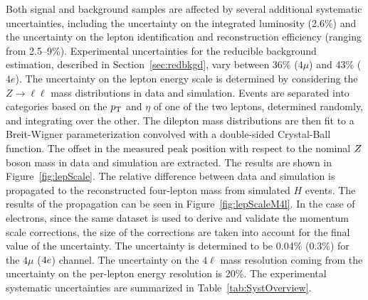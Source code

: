 Both signal and background samples are affected by several additional systematic uncertainties, including the uncertainty on the integrated luminosity
(2.6\%) and the uncertainty on the lepton identification and reconstruction efficiency (ranging from 2.5--9\%). Experimental uncertainties for the reducible background estimation, 
described in Section~\ref{sec:redbkgd},
vary between 36\% ($4\mu$)  and 43\% ($4e$).  The uncertainty on the lepton energy scale is determined by considering the 
$Z\rightarrow\ell\ell$ mass distributions in data and simulation. Events are separated into categories based on the 
$p_{\rm{T}}$ and $\eta$ of one of the two leptons, determined randomly, and integrating over the other. The dilepton mass 
distributions are then fit to a Breit-Wigner 
parameterization convolved with a double-sided Crystal-Ball function. The offset in the measured peak position with 
respect to the nominal $Z$ boson 
mass in data and simulation are extracted. The results are shown in Figure~\ref{fig:lepScale}. The relative difference 
between data and simulation is propagated to the reconstructed four-lepton mass 
from simulated $H$ events. The results of the propagation can be seen in Figure~\ref{fig:lepScaleM4l}.
In the case of electrons, since the same dataset is used to derive and validate the 
momentum scale corrections, the size 
of the corrections are taken into account for the final value of the uncertainty.
The uncertainty is determined to be 0.04\% (0.3\%) for the  $4\mu$ ($4e$) channel. The uncertainty 
on the $4\ell$ mass resolution coming from the uncertainty on the per-lepton energy resolution is 20\%. The experimental systematic uncertainties are summarized in Table~\ref{tab:SystOverview}.


